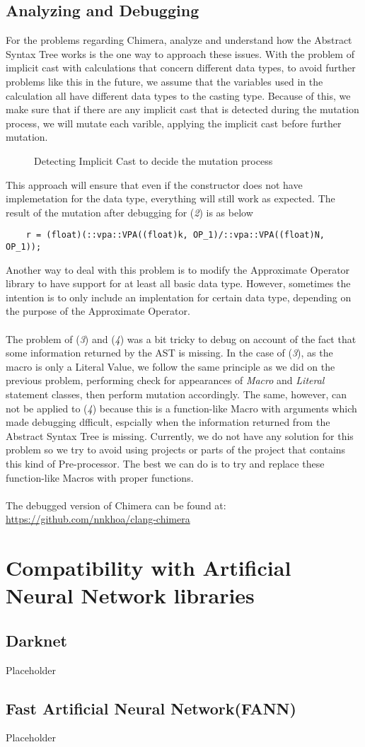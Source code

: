 \subsection{Analyzing and Debugging}

For the problems regarding Chimera, analyze and understand how the Abstract Syntax Tree works is the one way to approach these issues. With the problem of implicit cast with calculations that concern different data types, to avoid further problems like this in the future, we assume that the variables used in the calculation all have different data types to the casting type. Because of this, we make sure that if there are any implicit cast that is detected during the mutation process, we will mutate each varible, applying the implicit cast before further mutation. 
\begin{figure}[H]
\centering
\caption{Detecting Implicit Cast to decide the mutation process}
\end{figure}
This approach will ensure that even if the constructor does not have implemetation for the data type, everything will still work as expected. The result of the mutation after debugging for (\textit{2}) is as below
\begin{verbatim}
	r = (float)(::vpa::VPA((float)k, OP_1)/::vpa::VPA((float)N, OP_1));
\end{verbatim}
Another way to deal with this problem is to modify the Approximate Operator library to have support for at least all basic data type. However, sometimes the intention is to only include an implentation for certain data type, depending on the purpose of the Approximate Operator. \\
~\\
The problem of (\textit{3}) and (\textit{4}) was a bit tricky to debug on account of the fact that some information returned by the AST is missing. In the case of (\textit{3}), as the macro is only a Literal Value, we follow the same principle as we did on the previous problem, performing check for appearances of \textit{Macro} and \textit{Literal} statement classes, then perform mutation accordingly. The same, however, can not be applied to (\textit{4}) because this is a function-like Macro with arguments which made debugging dfficult, espcially when the information returned from the Abstract Syntax Tree is missing. Currently, we do not have any solution for this problem so we try to avoid using projects or parts of the project that contains this kind of Pre-processor. The best we can do is to try and replace these function-like Macros with proper functions. \\
~\\
The debugged version of Chimera can be found at: \url{https://github.com/nnkhoa/clang-chimera}\\
\section{Compatibility with Artificial Neural Network libraries}

\subsection{Darknet}
Placeholder
\subsection{Fast Artificial Neural Network(FANN)}
Placeholder